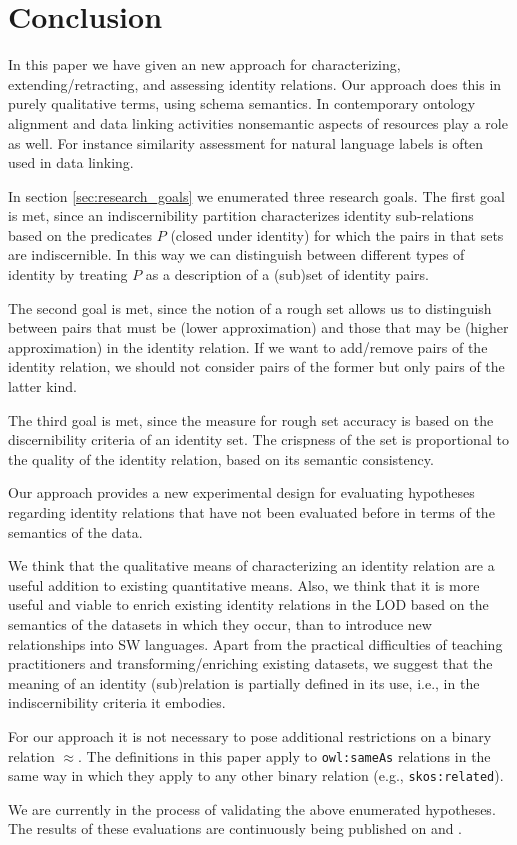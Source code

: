 \section{Conclusion}
\label{sec:conclusion}

In this paper we have given an new approach for characterizing,
  extending/retracting, and assessing identity relations.
Our approach does this in purely qualitative terms, using schema semantics.
In contemporary ontology alignment and data linking activities nonsemantic
  aspects of resources play a role as well.
For instance similarity assessment for natural language labels is often
  used in data linking.

In section \ref{sec:research_goals} we enumerated three research goals.
The first goal is met, since an indiscernibility partition characterizes
  identity sub-relations based on the predicates $P$ (closed under identity)
  for which the pairs in that sets are indiscernible.
In this way we can distinguish between different types of identity
  by treating $P$ as a description of a (sub)set of identity pairs.

The second goal is met, since the notion of a rough set allows us to
  distinguish between pairs that must be (lower approximation)
  and those that may be (higher approximation)
  in the identity relation.
If we want to add/remove pairs of the identity relation,
  we should not consider pairs of the former but only pairs of
  the latter kind.

The third goal is met, since the measure for rough set accuracy
  is based on the discernibility criteria of an identity set.
The crispness of the set is proportional to the quality of the
  identity relation, based on its semantic consistency.

Our approach provides a new experimental design for evaluating
  hypotheses regarding identity relations that have not been
  evaluated before in terms of the semantics of the data.

We think that the qualitative means of characterizing an identity relation
  are a useful addition to existing quantitative means.
Also, we think that it is more useful and viable to enrich existing
  identity relations in the LOD based on the semantics of the datasets
  in which they occur, than to introduce new relationships into SW languages.
Apart from the practical difficulties of teaching practitioners
  and transforming/enriching existing datasets, we suggest that the
  meaning of an identity (sub)relation is partially defined in its use,
  i.e., in the indiscernibility criteria it embodies.

For our approach it is not necessary to pose additional restrictions
  on a binary relation $\approx$.
The definitions in this paper apply to {\small \texttt{owl:sameAs}} relations
  in the same way in which they apply to any other binary relation
  (e.g., {\small \texttt{skos:related}}).

We are currently in the process of validating the above enumerated hypotheses.
The results of these evaluations are continuously being published on
   and
.
